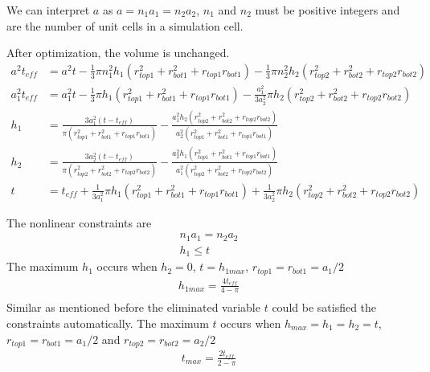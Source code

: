 \documentclass[12pt]{article}
\numberwithin{equation}{section}
\numberwithin{equation}{section}
\begin{document}
\begin{outline}[enumerate]
We can interpret $a$ as $a = n_1 a_1 = n_2 a_2$, $n_1$ and $n_2$ must be positive integers and are the number of unit cells in a simulation cell.  

After optimization, the volume is unchanged. 
\begin{align*}
a^2t_{eff} &=a^2t - \frac{1}{3}\pi n_1^2h_1(r_{top1}^2+r_{bot1}^2+r_{top1}r_{bot1})- \frac{1}{3}\pi n_2^2 h_2(r_{top2}^2+r_{bot2}^2+r_{top2}r_{bot2})\nonumber \\
a_1^2t_{eff} &=a_1^2t - \frac{1}{3}\pi h_1(r_{top1}^2+r_{bot1}^2+r_{top1}r_{bot1})- \frac{a_1^2}{3a_2^2}\pi h_2(r_{top2}^2+r_{bot2}^2+r_{top2}r_{bot2})\nonumber \\
h_1&= \frac{3a_1^2(t-t_{eff})}{\pi (r_{top1}^2+r_{bot1}^2+r_{top1}r_{bot1})} - \frac{a_1^2  h_2(r_{top2}^2+r_{bot2}^2+r_{top2}r_{bot2})}{a_2^2 (r_{top1}^2+r_{bot1}^2+r_{top1}r_{bot1})} \nonumber \\
h_2&= \frac{3a_2^2(t-t_{eff})}{\pi (r_{top2}^2+r_{bot2}^2+r_{top2}r_{bot2})} - \frac{a_2^2  h_1(r_{top1}^2+r_{bot1}^2+r_{top1}r_{bot1})}{a_1^2 (r_{top2}^2+r_{bot2}^2+r_{top2}r_{bot2})} \nonumber \\
t &= t_{eff} + \frac{1}{3a_1^2}\pi h_1(r_{top1}^2+r_{bot1}^2+r_{top1}r_{bot1})+ \frac{1}{3a_2^2} \pi h_2(r_{top2}^2+r_{bot2}^2+r_{top2}r_{bot2})
\end {align*}

The nonlinear constraints are 
\begin{align}
n_1a_1 = n_2a_2 \\
h_1 \leq t 
\end{align}
The maximum $h_1$ occurs when $h_2 = 0$, $t = h_{1max}$, $r_{top1} = r_{bot1} = a_1/2$ 
\begin{align*}
h_{1max} = \frac {4t_{eff}}{4- \pi}\\
\end {align*}
Similar as mentioned before the eliminated variable $t$ could be satisfied the constraints automatically. 
The maximum $t$ occurs when $h_{max}=h_1 = h_2 = t$, $r_{top1} = r_{bot1} = a_1/2$ and $r_{top2} = r_{bot2} = a_2/2$
\begin{align*}
t_{max} = \frac {2t_{eff}}{2- \pi}
\end{align*}


\end{outline}
\end{document}
